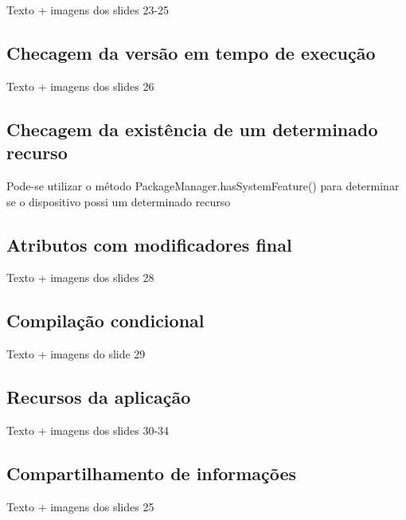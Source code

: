 Texto + imagens dos slides 23-25

\subsection{Checagem da versão em tempo de execução}

Texto + imagens dos slides 26

\subsection{Checagem da existência de um determinado recurso}
Pode-se utilizar o método PackageManager.hasSystemFeature() para determinar se o 
dispositivo possi um determinado recurso

\subsection{Atributos com modificadores final}

Texto + imagens dos slides 28


\subsection{Compilação condicional}

Texto + imagens do slide 29


\subsection{Recursos da aplicação}

Texto + imagens dos slides 30-34


\subsection{Compartilhamento de informações}

Texto + imagens dos slides 25

